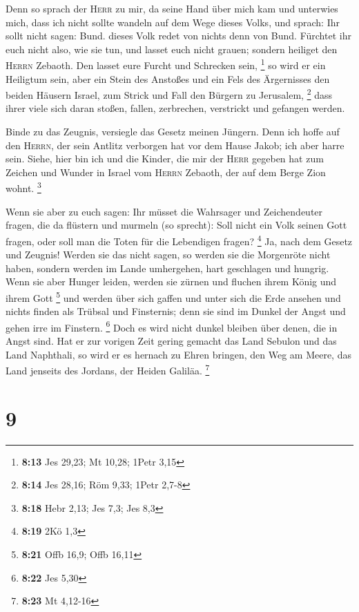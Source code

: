  Denn so sprach der \textsc{Herr} zu mir, da seine Hand
über mich kam und unterwies mich, dass ich nicht sollte wandeln auf dem
Wege dieses Volks, und sprach:  Ihr sollt nicht sagen:
Bund. dieses Volk redet von nichts denn von Bund. Fürchtet ihr euch
nicht also, wie sie tun, und lasset euch nicht grauen; 
sondern heiliget den \textsc{Herrn} Zebaoth. Den lasset eure Furcht und
Schrecken sein, \footnote{\textbf{8:13} Jes 29,23; Mt 10,28; 1Petr 3,15}
 so wird er ein Heiligtum sein, aber ein Stein des
Anstoßes und ein Fels des Ärgernisses den beiden Häusern Israel, zum
Strick und Fall den Bürgern zu Jerusalem, \footnote{\textbf{8:14} Jes
  28,16; Röm 9,33; 1Petr 2,7-8}  dass ihrer viele sich
daran stoßen, fallen, zerbrechen, verstrickt und gefangen werden.

 Binde zu das Zeugnis, versiegle das Gesetz meinen
Jüngern.  Denn ich hoffe auf den \textsc{Herrn}, der sein
Antlitz verborgen hat vor dem Hause Jakob; ich aber harre sein.
 Siehe, hier bin ich und die Kinder, die mir der
\textsc{Herr} gegeben hat zum Zeichen und Wunder in Israel vom
\textsc{Herrn} Zebaoth, der auf dem Berge Zion wohnt. \footnote{\textbf{8:18}
  Hebr 2,13; Jes 7,3; Jes 8,3}

 Wenn sie aber zu euch sagen: Ihr müsset die Wahrsager
und Zeichendeuter fragen, die da flüstern und murmeln (so sprecht): Soll
nicht ein Volk seinen Gott fragen, oder soll man die Toten für die
Lebendigen fragen? \footnote{\textbf{8:19} 2Kö 1,3}  Ja,
nach dem Gesetz und Zeugnis! Werden sie das nicht sagen, so werden sie
die Morgenröte nicht haben,  sondern werden im Lande
umhergehen, hart geschlagen und hungrig. Wenn sie aber Hunger leiden,
werden sie zürnen und fluchen ihrem König und ihrem Gott \footnote{\textbf{8:21}
  Offb 16,9; Offb 16,11}  und werden über sich gaffen und
unter sich die Erde ansehen und nichts finden als Trübsal und
Finsternis; denn sie sind im Dunkel der Angst und gehen irre im
Finstern. \footnote{\textbf{8:22} Jes 5,30}  Doch es wird
nicht dunkel bleiben über denen, die in Angst sind. Hat er zur vorigen
Zeit gering gemacht das Land Sebulon und das Land Naphthali, so wird er
es hernach zu Ehren bringen, den Weg am Meere, das Land jenseits des
Jordans, der Heiden Galiläa. \footnote{\textbf{8:23} Mt 4,12-16}

\hypertarget{section-4}{%
\section{9}\label{section-4}}

